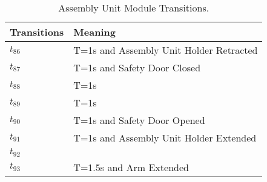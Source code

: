\begin{table}[H]
\caption{Assembly Unit Module Transitions.}
\centering
\begin{tabular}{M{5cm}M{10cm}}
Transitions & Meaning\\
\hline
\hyperlink{partialNet:tt861}{\hypertarget{partialTable:tt86}{$t_{86}$}} & T=1s and Assembly Unit Holder Retracted\\
\hyperlink{partialNet:tt871}{\hypertarget{partialTable:tt87}{$t_{87}$}} & T=1s and Safety Door Closed\\
\hyperlink{partialNet:tt881}{\hypertarget{partialTable:tt88}{$t_{88}$}} & T=1s\\
\hyperlink{partialNet:tt891}{\hypertarget{partialTable:tt89}{$t_{89}$}} & T=1s\\
\hyperlink{partialNet:tt901}{\hypertarget{partialTable:tt90}{$t_{90}$}} & T=1s and Safety Door Opened\\
\hyperlink{partialNet:tt911}{\hypertarget{partialTable:tt91}{$t_{91}$}} & T=1s and Assembly Unit Holder Extended\\
\hyperlink{partialNet:t921}{\hypertarget{partialTable:t92}{$t_{92}$}} & \\
\hyperlink{partialNet:tt931}{\hypertarget{partialTable:tt93}{$t_{93}$}} & T=1.5s and Arm Extended\\
\end{tabular}
\end{table}
